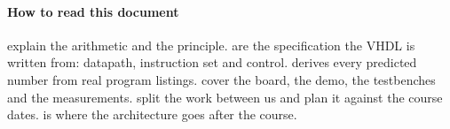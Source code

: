 \paragraph{How to read this document}  explain the arithmetic and the principle.  are the specification the VHDL is written from: datapath, instruction set and control.  derives every predicted number from real program listings.  cover the board, the demo, the testbenches and the measurements.  split the work between us and plan it against the course dates.  is where the architecture goes after the course.

